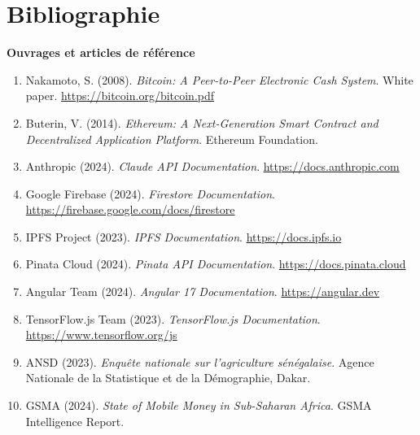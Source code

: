 \documentclass[12pt,a4paper]{report}
\begin{document}
\vspace{0.8cm}

\clearpage
\chapter*{Bibliographie}

\noindent
\textbf{Ouvrages et articles de référence}

\vspace{0.3cm}

\begin{enumerate}[leftmargin=*,itemsep=6pt]
  \item Nakamoto, S. (2008). \textit{Bitcoin: A Peer-to-Peer Electronic Cash System}.
        White paper. \url{https://bitcoin.org/bitcoin.pdf}
  \item Buterin, V. (2014). \textit{Ethereum: A Next-Generation Smart Contract and
          Decentralized Application Platform}. Ethereum Foundation.
  \item Anthropic (2024). \textit{Claude API Documentation}.
        \url{https://docs.anthropic.com}
  \item Google Firebase (2024). \textit{Firestore Documentation}.
        \url{https://firebase.google.com/docs/firestore}
  \item IPFS Project (2023). \textit{IPFS Documentation}. \url{https://docs.ipfs.io}
  \item Pinata Cloud (2024). \textit{Pinata API Documentation}.
        \url{https://docs.pinata.cloud}
  \item Angular Team (2024). \textit{Angular 17 Documentation}.
        \url{https://angular.dev}
  \item TensorFlow.js Team (2023). \textit{TensorFlow.js Documentation}.
        \url{https://www.tensorflow.org/js}
  \item ANSD (2023). \textit{Enquête nationale sur l'agriculture sénégalaise}. Agence
        Nationale de la Statistique et de la Démographie, Dakar.
  \item GSMA (2024). \textit{State of Mobile Money in Sub-Saharan Africa}. GSMA
        Intelligence Report.
\end{enumerate}
\appendix
\end{document}
